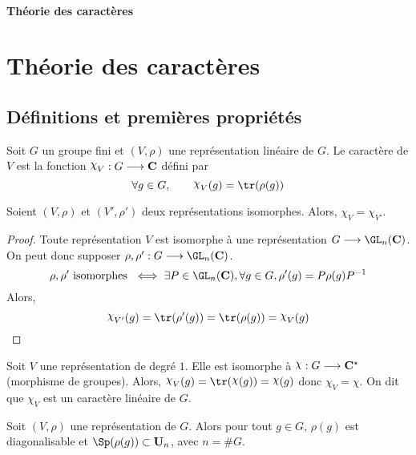 \ifsolo
    ~

    \vspace{1cm}

    \begin{center}
        \textbf{\LARGE Théorie des caractères} \\[1em]
    \end{center}
    \tableofcontents
\else
    \chapter{Théorie des caractères}

    \minitoc
\fi
\thispagestyle{empty}

\section{Définitions et premières propriétés}

\begin{dfn}
    Soit $G$ un groupe fini et  $(V, \rho)$ une représentation linéaire de  $G$. Le caractère de  $V$ est la fonction  $\chi_V: G \longrightarrow  \C$ défini par \[
        \forall  g \in  G, \qquad  \chi_V(g)=\tr(\rho(g))
    \] 
\end{dfn}

\begin{prop}
    Soient $(V, \rho)$ et  $(V', \rho')$ deux représentations isomorphes. Alors,  $\chi_V=\chi_{V'}$.
\end{prop}

\begin{proof}
    Toute représentation $V$ est  isomorphe à une représentation $G \longrightarrow \GL_n(\C)$. On peut donc supposer $\rho, \rho': G \longrightarrow \GL_n(\C)$. 
    \[
        \rho, \rho' \text{ isomorphes } \iff \exists P \in  \GL_n(\C), \forall  g \in  G, \rho'(g)=P\rho(g)P^{-1}
    \]
    Alors, \[
        \chi_{V'}(g)=\tr(\rho'(g))=\tr(\rho(g))=\chi_V(g)
    \]
\end{proof}

\begin{ex}
    Soit $V$ une représentation de degré  $1$. Elle est isomorphe à  $\chi : G \longrightarrow \C^\star$ (morphisme de groupes). Alors, $\chi_V(g)=\tr(\chi(g))=\chi(g)$ donc  $\chi_V=\chi$. On dit que  $\chi_V$ est un caractère linéaire de  $G$.
\end{ex}

\begin{prop}
    Soit $(V, \rho)$ une représentation de  $G$. Alors pour tout  $g \in  G$, $\rho(g)$ est diagonalisable et  $\Sp(\rho(g))\subset \U_n$, avec $n=\#G$.
\end{prop}

